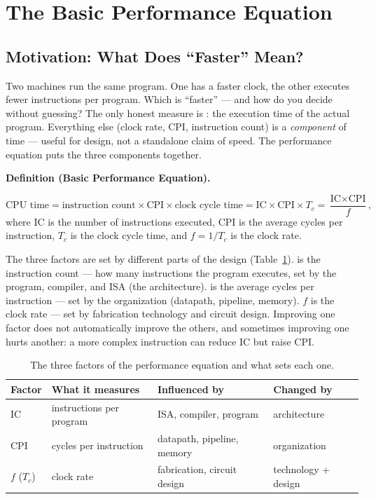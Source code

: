 \documentclass[11pt]{article}
\newenvironment{definitionbox}[1]{%
  \par\noindent\textbf{Definition (#1).}\ \itshape
}{\par\vspace{0.3em}}
\begin{document}
\section{The Basic Performance Equation}
\label{sec:performance-equation}

\subsection{Motivation: What Does ``Faster'' Mean?}

Two machines run the same program. One has a faster clock, the other executes fewer instructions per program. Which is ``faster'' --- and how do you decide without guessing? The only honest measure is : the execution time of the actual program. Everything else (clock rate, CPI, instruction count) is a \emph{component} of time --- useful for design, not a standalone claim of speed. The performance equation puts the three components together.

\begin{definitionbox}{Basic Performance Equation}
\[
  \text{CPU time} = \text{instruction count} \times \text{CPI} \times
  \text{clock cycle time} = \text{IC} \times \text{CPI} \times T_c =
  \frac{\text{IC} \times \text{CPI}}{f},
\]
where $\text{IC}$ is the number of instructions executed, $\text{CPI}$ is the average cycles per instruction, $T_c$ is the clock cycle time, and $f = 1/T_c$ is the clock rate.
\end{definitionbox}

The three factors are set by different parts of the design (Table~\ref{tab:factors}).  is the instruction count --- how many instructions the program executes, set by the program, compiler, and ISA (the architecture).  is the average cycles per instruction --- set by the organization (datapath, pipeline, memory). $f$ is the clock rate --- set by fabrication technology and circuit design. Improving one factor does not automatically improve the others, and sometimes improving one hurts another: a more complex instruction can reduce IC but raise CPI.

\begin{table}[h]
\centering
\small
\renewcommand{\arraystretch}{1.15}
\begin{tabular}{@{}p{3.2cm}p{3.6cm}p{3.6cm}p{3.6cm}@{}}
\toprule
\textbf{Factor} & \textbf{What it measures} & \textbf{Influenced by} & \textbf{Changed by} \\
\midrule
$\text{IC}$ & instructions per program & ISA, compiler, program & architecture \\
$\text{CPI}$ & cycles per instruction & datapath, pipeline, memory & organization \\
$f$ ($T_c$) & clock rate & fabrication, circuit design & technology + design \\
\bottomrule
\end{tabular}
\caption{The three factors of the performance equation and what sets each one.}
\label{tab:factors}
\end{table}
\end{document}

